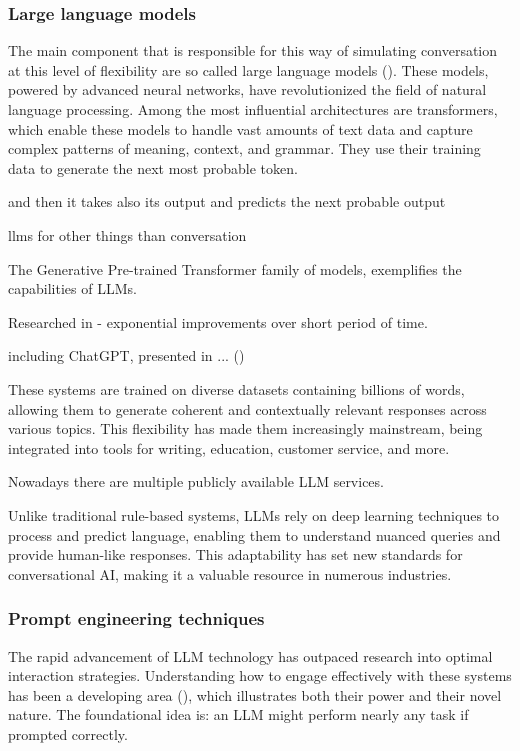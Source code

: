 \documentclass[12pt]{report}
\begin{document}
{\subsubsection{Large language models}

The main component that is responsible for
this way of simulating conversation at this level of flexibility
are so called large language models ().
These models, powered by advanced neural networks,
have revolutionized the field of natural language processing.
Among the most influential architectures are transformers,
which enable these models to handle
vast amounts of text data and capture complex patterns of meaning, context, and grammar.
They use their training data to generate the next most probable token.

and then it takes also its output and predicts the next probable output

llms for other things than conversation

The Generative Pre-trained Transformer family of models,
exemplifies the capabilities of LLMs.

Researched in - exponential improvements over short period of time.

including ChatGPT, presented in ... ()

These systems are trained on diverse datasets containing billions of words,
allowing them to generate coherent and contextually relevant responses across various topics.
This flexibility has made them increasingly mainstream,
being integrated into tools for writing, education, customer service, and more.

Nowadays there are multiple publicly available LLM services.

Unlike traditional rule-based systems,
LLMs rely on deep learning techniques to process and predict language,
enabling them to understand nuanced queries and provide human-like responses.
This adaptability has set new standards for conversational AI,
making it a valuable resource in numerous industries.

\subsubsection{Prompt engineering techniques}

The rapid advancement of LLM technology
has outpaced research into optimal interaction strategies.
Understanding how to engage effectively
with these systems has been a developing area (),
which illustrates both their power and their novel nature.
The foundational idea is:
an LLM might perform nearly any task if prompted correctly.

}
\end{document}
